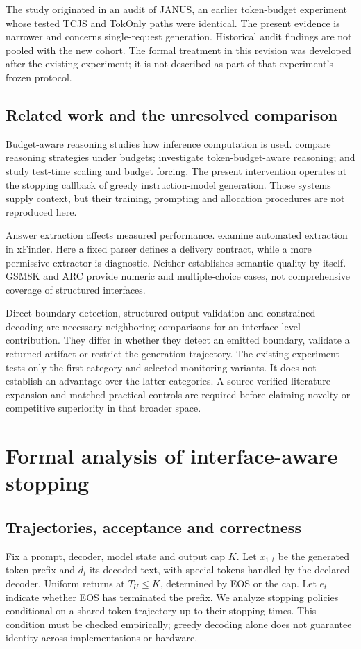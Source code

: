 \documentclass[12pt,a4paper]{article}
\begin{document}
The study originated in an audit of JANUS, an earlier token-budget experiment whose tested TCJS and TokOnly paths were identical. The present evidence is narrower and concerns single-request generation. Historical audit findings are not pooled with the new cohort. The formal treatment in this revision was developed after the existing experiment; it is not described as part of that experiment's frozen protocol.

\subsection{Related work and the unresolved comparison}
Budget-aware reasoning studies how inference computation is used. \citet{wang2024} compare reasoning strategies under budgets; \citet{han2025} investigate token-budget-aware reasoning; and \citet{muennighoff2025} study test-time scaling and budget forcing. The present intervention operates at the stopping callback of greedy instruction-model generation. Those systems supply context, but their training, prompting and allocation procedures are not reproduced here.

Answer extraction affects measured performance. \citet{yu2025} examine automated extraction in xFinder. Here a fixed parser defines a delivery contract, while a more permissive extractor is diagnostic. Neither establishes semantic quality by itself. GSM8K \citep{cobbe2021} and ARC \citep{clark2018} provide numeric and multiple-choice cases, not comprehensive coverage of structured interfaces.

Direct boundary detection, structured-output validation and constrained decoding are necessary neighboring comparisons for an interface-level contribution. They differ in whether they detect an emitted boundary, validate a returned artifact or restrict the generation trajectory. The existing experiment tests only the first category and selected monitoring variants. It does not establish an advantage over the latter categories. A source-verified literature expansion and matched practical controls are required before claiming novelty or competitive superiority in that broader space.

\section{Formal analysis of interface-aware stopping}\label{sec:formal}
\subsection{Trajectories, acceptance and correctness}
Fix a prompt, decoder, model state and output cap $K$. Let $x_{1:t}$ be the generated token prefix and $d_t$ its decoded text, with special tokens handled by the declared decoder. Uniform returns at $T_U\leq K$, determined by EOS or the cap. Let $e_t$ indicate whether EOS has terminated the prefix. We analyze stopping policies conditional on a shared token trajectory up to their stopping times. This condition must be checked empirically; greedy decoding alone does not guarantee identity across implementations or hardware.
\end{document}

